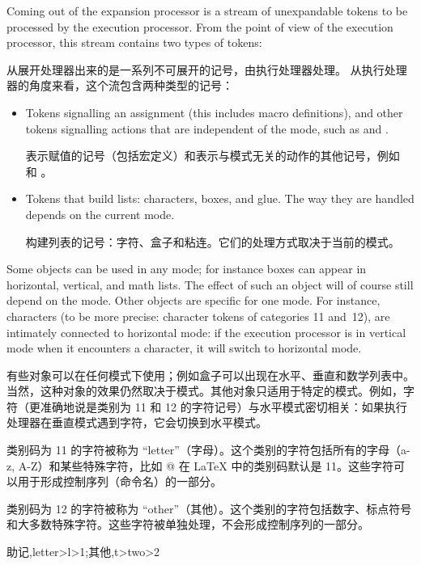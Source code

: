 Coming out of the expansion processor is a stream of
unexpandable tokens to be processed by
the execution processor. 
\relax From the point of view of the execution processor, this
stream contains two types of tokens:

从展开处理器出来的是一系列不可展开的记号，由执行处理器处理。
从执行处理器的角度来看，这个流包含两种类型的记号：
\begin{itemize}
\item Tokens signalling an assignment (this includes
      macro definitions), and
      other tokens signalling actions
      that are independent of the mode, such
      as  and .

      表示赋值的记号（包括宏定义）和表示与模式无关的动作的其他记号，例如  和 。
\item Tokens that build lists:
      characters, boxes, and glue. The way they are handled
      depends on the current mode.

      构建列表的记号：字符、盒子和粘连。它们的处理方式取决于当前的模式。
\end{itemize}

Some objects can be used in any mode; for instance boxes
can appear in horizontal, vertical, and math lists.
The effect of such an object will of course still depend on the mode.
Other objects are  specific for one mode.
For instance, characters (to be more precise:
character tokens of categories 11 and~12), 
are intimately connected to horizontal mode:
if the execution processor 
is in vertical mode when it encounters a character, it will
switch to horizontal mode.



有些对象可以在任何模式下使用；例如盒子可以出现在水平、垂直和数学列表中。当然，这种对象的效果仍然取决于模式。其他对象只适用于特定的模式。例如，字符（更准确地说是类别为 11 和 12 的字符记号）与水平模式密切相关：如果执行处理器在垂直模式遇到字符，它会切换到水平模式。

\begin{引述之言}
类别码为 11 的字符被称为 ``letter''（字母）。这个类别的字符包括所有的字母（a-z, A-Z）和某些特殊字符，比如 @ 在 LaTeX 中的类别码默认是 11。这些字符可以用于形成控制序列（命令名）的一部分。

类别码为 12 的字符被称为 ``other''（其他）。这个类别的字符包括数字、标点符号和大多数特殊字符。这些字符被单独处理，不会形成控制序列的一部分。

助记,letter>l>1;其他,t>two>2
\end{引述之言}



